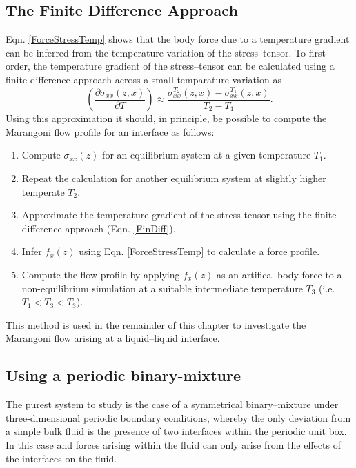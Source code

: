 \subsection{The Finite Difference Approach}
Eqn. \ref{ForceStressTemp} shows that the body force due to a temperature gradient can be inferred from the temperature variation of the stress--tensor. 
To first order, the temperature gradient of the stress--tensor can be calculated using a finite difference approach across a small temparature variation as
\begin{equation}
\label{FinDiff}
\left( \frac{\partial \sigma_{xx}(z,x)}{\partial T} \right) \approx \frac{\sigma_{xx}^{T_{2}}(z,x) - \sigma_{xx}^{T_{1}}(z,x)}{T_{2} - T_{1}}.
\end{equation}
Using this approximation it should, in principle, be possible to compute the Marangoni flow profile for an interface as follows:
\begin{enumerate}
	\item Compute $\sigma_{xx}(z)$ for an equilibrium system at a given temperature $T_{1}$.
	\item Repeat the calculation for another equilibrium system at slightly higher temperate $T_{2}$.
	\item Approximate the temperature gradient of the stress tensor using the finite difference approach (Eqn. \ref{FinDiff}).
	\item Infer $f_{x}(z)$ using Eqn. \ref{ForceStressTemp} to calculate a force profile.
	\item Compute the flow profile by applying $f_{x}(z)$ as an artifical body force to a non-equilibrium simulation at a suitable intermediate temperature $T_{3}$ (i.e. $T_{1} < T_{3} < T_{3}$).
\end{enumerate}

This method is used in the remainder of this chapter to investigate the Marangoni flow arising at a liquid--liquid interface. 

\subsection{Using a periodic binary-mixture}
The purest system to study is the case of a symmetrical binary--mixture under three-dimensional periodic boundary conditions, whereby the only deviation from a simple bulk fluid is the presence of two interfaces within the periodic unit box. 
In this case and forces arising within the fluid can only arise from the effects of the interfaces on the fluid.

